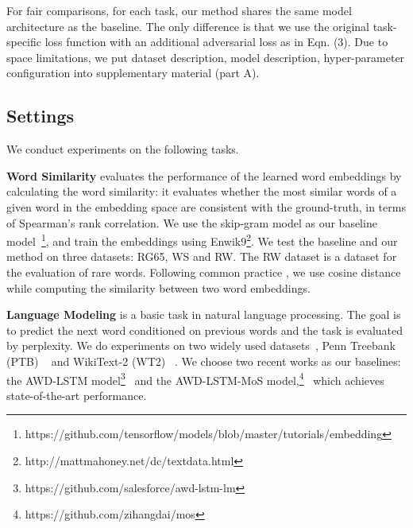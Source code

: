 \documentclass{article}
\begin{document}
For fair comparisons, for each task, our method shares the same model architecture as the baseline. The only difference is that we use the original task-specific loss function with an additional adversarial loss as in Eqn. (3). Due to space limitations, we put dataset description, model description, hyper-parameter configuration into supplementary material (part A).

\subsection{Settings}
We conduct experiments on the following tasks.

\textbf{Word Similarity} evaluates the performance of the learned word embeddings by calculating the word similarity: it evaluates whether the most similar words of a given word in the embedding space are consistent with the ground-truth, in terms of Spearman’s rank correlation. We use the skip-gram model as our baseline model~\cite{mikolov2013distributed}\footnote{https://github.com/tensorflow/models/blob/master/tutorials/embedding}, and train the embeddings using Enwik9\footnote{
http://mattmahoney.net/dc/textdata.html}. We test the baseline and our method on three datasets: RG65, WS and RW. The RW dataset is a dataset for the evaluation of rare words. Following common practice \cite{mikolov2013distributed,polyglot:2013:ACL-CoNLL,DBLP:conf/emnlp/PenningtonSM14,mu2017all}, we use cosine distance while computing the similarity between two word embeddings.

\textbf{Language Modeling} is a basic task in natural language processing. The goal is to predict the next word conditioned on previous words and the task is evaluated by perplexity. We do experiments on two widely used datasets~\cite{DBLP:journals/corr/abs-1708-02182,DBLP:journals/corr/MerityXBS16,DBLP:journals/corr/abs-1711-03953}, Penn Treebank (PTB) ~\cite{DBLP:conf/interspeech/MikolovKBCK10} and WikiText-2 (WT2) ~\cite{DBLP:journals/corr/MerityXBS16}. We choose two recent works as our baselines: the AWD-LSTM model\footnote{https://github.com/salesforce/awd-lstm-lm}~\cite{DBLP:journals/corr/abs-1708-02182} and the AWD-LSTM-MoS model,\footnote{https://github.com/zihangdai/mos}~\cite{DBLP:journals/corr/abs-1711-03953} which achieves state-of-the-art performance.
\end{document}
